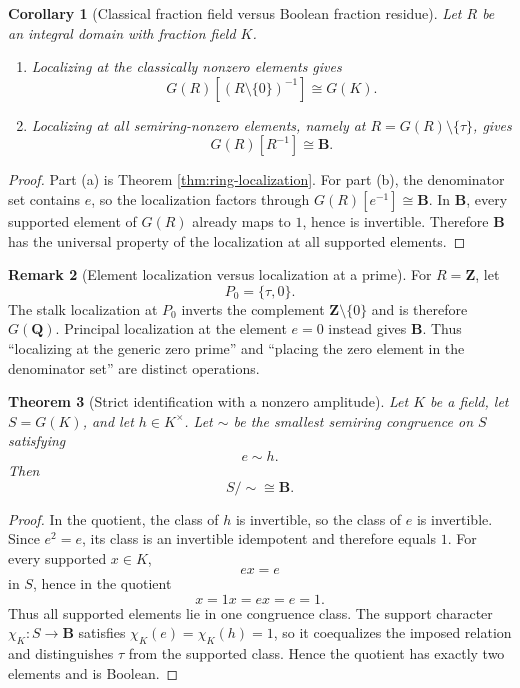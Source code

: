 \documentclass[11pt]{amsart}
\numberwithin{equation}{section}
\newtheorem{theorem}{Theorem}[section]
\newtheorem{corollary}[theorem]{Corollary}
\theoremstyle{definition}
\newtheorem{remark}[theorem]{Remark}
\newcommand{\B}{\mathbf B}
\newcommand{\Z}{\mathbf Z}
\newcommand{\Q}{\mathbf Q}
\begin{document}
\begin{corollary}[Classical fraction field versus Boolean fraction residue]\label{cor:fraction-comparison}
Let $R$ be an integral domain with fraction field $K$.
\begin{enumerate}[label=\textup{(\alph*)}]
\item Localizing at the classically nonzero elements gives
\[
G(R)[(R\setminus\{0\})^{-1}]
\cong
G(K).
\]
\item Localizing at all semiring-nonzero elements, namely at $R=G(R)\setminus\{\tau\}$, gives
\[
G(R)[R^{-1}]
\cong
\B.
\]
\end{enumerate}
\end{corollary}

\begin{proof}
Part (a) is Theorem \ref{thm:ring-localization}.  For part (b), the denominator set contains $e$, so the localization factors through $G(R)[e^{-1}]\cong\B$.  In $\B$, every supported element of $G(R)$ already maps to $1$, hence is invertible.  Therefore $\B$ has the universal property of the localization at all supported elements.
\end{proof}

\begin{remark}[Element localization versus localization at a prime]\label{rem:prime-v-element}
For $R=\Z$, let
\[
P_0=\{\tau,0\}.
\]
The stalk localization at $P_0$ inverts the complement $\Z\setminus\{0\}$ and is therefore $G(\Q)$.  Principal localization at the element $e=0$ instead gives $\B$.  Thus ``localizing at the generic zero prime'' and ``placing the zero element in the denominator set'' are distinct operations.
\end{remark}

\begin{theorem}[Strict identification with a nonzero amplitude]\label{thm:strict-identification-collapse}
Let $K$ be a field, let $S=G(K)$, and let $h\in K^\times$.  Let $\sim$ be the smallest semiring congruence on $S$ satisfying
\[
e\sim h.
\]
Then
\[
S/{\sim}\cong\B.
\]
\end{theorem}

\begin{proof}
In the quotient, the class of $h$ is invertible, so the class of $e$ is invertible.  Since $e^2=e$, its class is an invertible idempotent and therefore equals $1$.  For every supported $x\in K$,
\[
ex=e
\]
in $S$, hence in the quotient
\[
x=1x=ex=e=1.
\]
Thus all supported elements lie in one congruence class.  The support character $\chi_K:S\to\B$ satisfies $\chi_K(e)=\chi_K(h)=1$, so it coequalizes the imposed relation and distinguishes $\tau$ from the supported class.  Hence the quotient has exactly two elements and is Boolean.
\end{proof}
\end{document}
